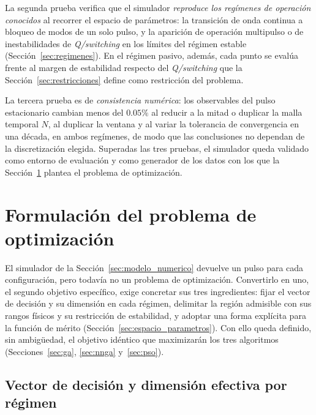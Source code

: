 La segunda prueba verifica que el simulador \emph{reproduce los regímenes de
operación conocidos} al recorrer el espacio de parámetros: la transición de onda
continua a bloqueo de modos de un solo pulso, y la aparición de operación
multipulso o de inestabilidades de \emph{Q\-/switching} en los límites del régimen
estable (Sección~\ref{sec:regimenes}). En el régimen pasivo, además, cada punto se evalúa
frente al margen de estabilidad respecto del \emph{Q\-/switching} que la
Sección~\ref{sec:restricciones} define como restricción del problema.

La tercera prueba es de \emph{consistencia numérica}: los observables del pulso
estacionario cambian menos del $0.05\%$ al reducir a la mitad o duplicar la malla
temporal $N$, al duplicar la ventana y al variar la tolerancia de convergencia en una
década, en ambos regímenes, de modo que las conclusiones no
dependan de la discretización elegida. Superadas las tres pruebas, el simulador
queda validado como entorno de evaluación y como generador de los datos con los que
la Sección~\ref{sec:formulacion_problema} plantea el problema de optimización.



\section{Formulación del problema de optimización}
\label{sec:formulacion_problema}

El simulador de la Sección~\ref{sec:modelo_numerico} devuelve un pulso para cada configuración, pero todavía no un problema de optimización. Convertirlo en uno, el segundo objetivo específico, exige concretar sus tres ingredientes: fijar el vector de decisión y su dimensión en cada régimen, delimitar la región admisible con sus rangos físicos y su restricción de estabilidad, y adoptar una forma explícita para la función de mérito (Sección~\ref{sec:espacio_parametros}). Con ello queda definido, sin ambigüedad, el objetivo idéntico que maximizarán los tres algoritmos (Secciones~\ref{sec:ga}, \ref{sec:nnga} y~\ref{sec:pso}).

\subsection{Vector de decisión y dimensión efectiva por régimen}
\label{sec:decision_vector}

